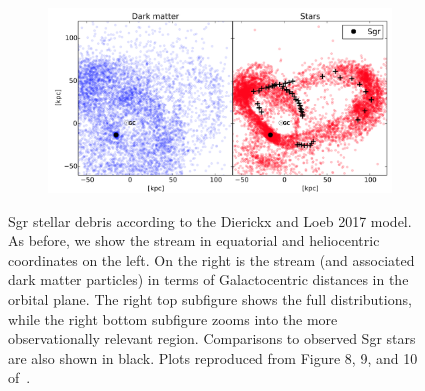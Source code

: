 \begin{figure}
\begin{subfigure}{0.52\textwidth}
        \includegraphics[width=\textwidth]{figs/dierickx2017-9.png}
    \end{subfigure}

    \caption{%
        Sgr stellar debris according to the Dierickx and Loeb 2017 model. As
        before, we show the stream in equatorial and heliocentric coordinates
        on the left. On the right is the stream (and associated dark matter
        particles) in terms of Galactocentric distances in the orbital plane.
        The right top subfigure shows the full distributions, while the right
        bottom subfigure zooms into the more observationally relevant region.
        Comparisons to observed Sgr stars are also shown in black. Plots
        reproduced from Figure 8, 9, and 10 of~\cite{dierickx_predicted_2017}.
    }
    \label{fig:dierickx}
\end{figure}
